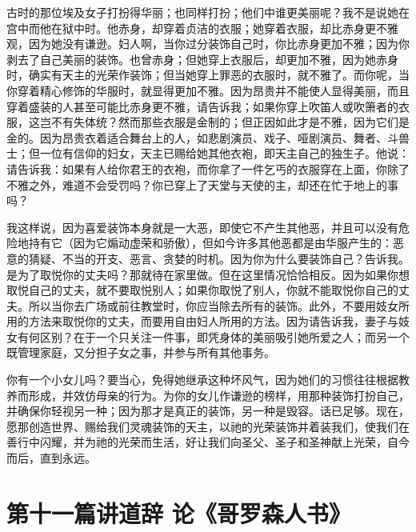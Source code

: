 古时的那位埃及女子打扮得华丽；也同样打扮；他们中谁更美丽呢？我不是说她在宫中而他在狱中时。他赤身，却穿着贞洁的衣服；她穿着衣服，却比赤身更不雅观，因为她没有谦逊。妇人啊，当你过分装饰自己时，你比赤身更加不雅；因为你剥去了自己美丽的装饰。也曾赤身；但她穿上衣服后，却更加不雅，因为她赤身时，确实有天主的光荣作装饰；但当她穿上罪恶的衣服时，就不雅了。而你呢，当你穿着精心修饰的华服时，就显得更加不雅。因为昂贵并不能使人显得美丽，而且穿着盛装的人甚至可能比赤身更不雅，请告诉我；如果你穿上吹笛人或吹箫者的衣服，这岂不有失体统？然而那些衣服是金制的；但正因如此才是不雅，因为它们是金的。因为昂贵衣着适合舞台上的人，如悲剧演员、戏子、哑剧演员、舞者、斗兽士；但一位有信仰的妇女，天主已赐给她其他衣袍，即天主自己的独生子。他说： 请告诉我：如果有人给你君王的衣袍，而你拿了一件乞丐的衣服穿在上面，你除了不雅之外，难道不会受罚吗？你已穿上了天堂与天使的主，却还在忙于地上的事吗？\par

我这样说，因为喜爱装饰本身就是一大恶，即使它不产生其他恶，并且可以没有危险地持有它（因为它煽动虚荣和骄傲），但如今许多其他恶都是由华服产生的：恶意的猜疑、不当的开支、恶言、贪婪的时机。因为你为什么要装饰自己？告诉我。是为了取悦你的丈夫吗？那就待在家里做。但在这里情况恰恰相反。因为如果你想取悦自己的丈夫，就不要取悦别人；如果你取悦了别人，你就不能取悦你自己的丈夫。所以当你去广场或前往教堂时，你应当除去所有的装饰。此外，不要用妓女所用的方法来取悦你的丈夫，而要用自由妇人所用的方法。因为请告诉我，妻子与妓女有何区别？在于一个只关注一件事，即凭身体的美丽吸引她所爱之人；而另一个既管理家庭，又分担子女之事，并参与所有其他事务。\par

你有一个小女儿吗？要当心，免得她继承这种坏风气，因为她们的习惯往往根据教养而形成，并效仿母亲的行为。为你的女儿作谦逊的榜样，用那种装饰打扮自己，并确保你轻视另一种；因为那才是真正的装饰，另一种是毁容。话已足够。现在，愿那创造世界、赐给我们灵魂装饰的天主，以祂的光荣装饰并着装我们，使我们在善行中闪耀，并为祂的光荣而生活，好让我们向圣父、圣子和圣神献上光荣，自今而后，直到永远。\par



\section{第十一篇讲道辞 论《哥罗森人书》}

